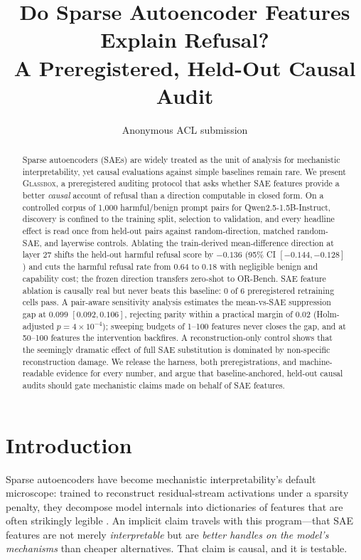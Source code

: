 \documentclass[11pt]{article}
\title{Do Sparse Autoencoder Features Explain Refusal?\\
A Preregistered, Held-Out Causal Audit}
\author{Anonymous ACL submission}
\newcommand{\glassbox}{\textsc{Glassbox}}
\begin{document}
\maketitle

\begin{abstract}
Sparse autoencoders (SAEs) are widely treated as the unit of analysis for
mechanistic interpretability, yet causal evaluations against simple baselines
remain rare.  We present \glassbox{}, a preregistered auditing protocol that
asks whether SAE features provide a better \emph{causal} account of refusal
than a direction computable in closed form.  On a controlled corpus of 1{,}000
harmful/benign prompt pairs for Qwen2.5-1.5B-Instruct, discovery is confined to
the training split, selection to validation, and every headline effect is read
once from held-out pairs against random-direction, matched random-SAE, and
layerwise controls.  Ablating the train-derived mean-difference direction at
layer 27 shifts the held-out harmful refusal score by $-0.136$ (95\% CI
$[-0.144, -0.128]$) and cuts the harmful refusal rate from $0.64$ to $0.18$
with negligible benign and capability cost; the frozen direction transfers
zero-shot to OR-Bench.  SAE feature ablation is causally real but never beats
this baseline: 0 of 6 preregistered retraining cells pass.  A pair-aware
sensitivity analysis estimates the mean-vs-SAE suppression gap at $0.099$
$[0.092, 0.106]$, rejecting parity within a practical margin of $0.02$
(Holm-adjusted $p=4\times10^{-4}$); sweeping budgets of 1--100 features never
closes the gap, and at 50--100 features the intervention backfires.  A
reconstruction-only control shows that the seemingly dramatic effect of full
SAE substitution is dominated by non-specific reconstruction damage.  We
release the harness, both preregistrations, and machine-readable evidence for
every number, and argue that baseline-anchored, held-out causal audits should
gate mechanistic claims made on behalf of SAE features.
\end{abstract}

\section{Introduction}
\label{sec:intro}

Sparse autoencoders have become mechanistic interpretability's default
microscope: trained to reconstruct residual-stream activations under a
sparsity penalty, they decompose model internals into dictionaries of features
that are often strikingly legible
\citep{bricken2023towards,cunningham2024sparse,templeton2024scaling,gao2024scaling}.
An implicit claim travels with this program---that SAE features are not merely
\emph{interpretable} but are \emph{better handles on the model's mechanisms}
than cheaper alternatives.  That claim is causal, and it is testable.
\end{document}
